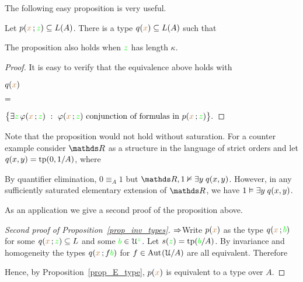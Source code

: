 The following easy proposition is very useful.

\begin{proposition}\label{prop_E_type}
Let $p({\color{brown} x}\,;{\color{green} z})\subseteq L(A)$.
There is a type $q({\color{brown} x})\subseteq L(A)$ such that


The proposition also holds when ${\color{green} z}$ has length $\kappa$.
\end{proposition}

\begin{proof}
  It is easy to verify that the equivalence above holds with
  \def\medrel#1{\parbox{6ex}{$\displaystyle\hfil #1$}}
  \def\ceq#1#2#3{\parbox[b]{10ex}{$\displaystyle #1$}\medrel{#2}$\displaystyle  #3$}

  \ceq{\hfill q({\mr x})}{=}{\big\{ \E {\gr z}\,\phi({\mr x}\,;{\gr z})\ :\ \phi({\mr x}\,;{\gr z}) \textrm{ conjunction of formulas in } p({\mr x}\,;{\gr z}) \big\}.}
\end{proof}

Note that the proposition would not hold without saturation.
For a counter example consider $\RR$ as a structure in the language of strict orders and let $q(x,y)={\rm tp}(0,1/A)$, where 


By quantifier elimination, $0\equiv_{A}1$ but $\RR,1\notmodels\E y\;q(x,y)$.
However, in any sufficiently saturated elementary extension of $\RR$, we have $1\vDash\exists y\;q(x,y)$.

As an application we give a second proof of the proposition above.

\begin{proof}[Second proof of Proposition~\ref{prop_inv_types}] $\Rightarrow$\quad  Write $p({\color{brown} x})$ as the type $q({\color{brown} x}\,;{\color{green} b})$ for some $q({\color{brown} x}\,;{\color{green} z})\subseteq L$ and some ${\color{green} b}\in\EuScript U^{\color{green} z}$.
Let $s({\color{green} z})={\rm tp}({\color{green} b}/A)$.
By invariance and homogeneity the types $q({\color{brown} x}\,;f{\color{green} b})$ for $f\in{\rm Aut\kern.15ex}(\EuScript U/A)$ are all equivalent.
Therefore

\smallskip

\smallskip

\smallskip

Hence, by Proposition~\ref{prop_E_type}, $p({\color{brown} x})$ is equivalent to a type over $A$.
\end{proof}

